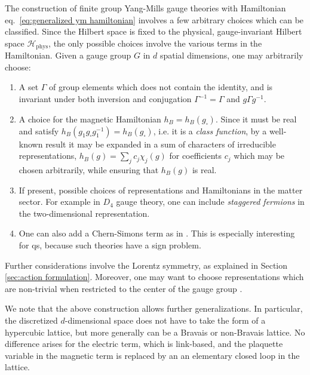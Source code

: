 The construction of finite group Yang-Mills gauge theories with Hamiltonian eq.~\eqref{eq:generalized ym hamiltonian} involves a few arbitrary choices which can be classified.
Since the Hilbert space is fixed to the physical, gauge-invariant Hilbert space $\mathcal{H}_{\mathrm{phys}}$, the only possible choices involve the various terms in the Hamiltonian.
Given a gauge group $G$ in $d$ spatial dimensions, one may arbitrarily choose:
\begin{enumerate}
    \item A set $\Gamma$ of group elements which does not contain the identity, and is invariant under both inversion and conjugation $\Gamma^{-1}=\Gamma$ and $g \Gamma g^{-1}$.

    \item A choice for the magnetic Hamiltonian $h_B = h_B(g_\square)$.
Since it must be real and satisfy $h_B(g_1 g_\square g_1^{-1})= h_B(g_\square)$, i.e.
it is a \textit{class function}, by a well-known result \cite{Serre} it may be expanded in a sum of characters of irreducible representations, $h_B(g) = \sum_j c_j \chi_j(g)$ for coefficients $c_j$ which may be chosen arbitrarily, while ensuring that $h_B(g)$ is real.
    \item If present, possible choices of representations and Hamiltonians in the matter sector.
For example in $D_4$ gauge theory, one can include \textit{staggered fermions} in the two-dimensional representation.

    \item One can also add a Chern-Simons term as in \cite{Caspar_Wiese}.
This is especially interesting for \ac{qs}, because such theories have a sign problem.
\end{enumerate}
Further considerations involve the Lorentz symmetry, as explained in Section \ref{sec:action formulation}.
Moreover, one may want to choose representations which are non-trivial when restricted to the center of the gauge group \cite{CenterSymmetry, Cohen_2014}.

We note that the above construction allows further generalizations.
In particular, the discretized $d$-dimensional space does not have to take the form of a hypercubic lattice, but more generally can be a Bravais or non-Bravais lattice.
No difference arises for the electric term, which is link-based, and the plaquette variable in the magnetic term is replaced by an an elementary closed loop in the lattice.


